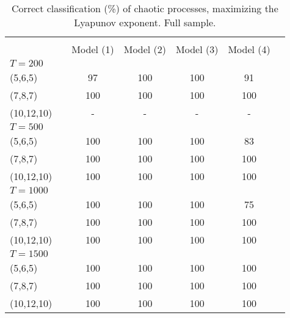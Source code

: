 \documentclass[12pt]{article}
\begin{document}
\begin{table} [H]\scriptsize
    \caption{ Correct classification (\%) of chaotic processes, maximizing the Lyapunov exponent. Full sample.}
    \begin{tabular*}{\textwidth}{@{\extracolsep{\fill}}lcccccc}
        \hline &  &  &  & &   \\ 
          &  &  Model (1) & Model (2)  & Model (3) & Model (4)  \\ 
        $T=200$  &  &  &  & &  & \\
        (5,6,5)                           &  & 97   & 100  & 100 &  91  \\ 
        (7,8,7)                           &  & 100  & 100  & 100 &  100  \\ 
        (10,12,10)                        &  & -    &  -   &  -  &  - \\ 
        \hline 
         $T=500$  &  &   & & &    \\ 

        (5,6,5)                           &  & 100 & 100 & 100 & 83  \\ 
        (7,8,7)                           &  & 100 & 100 & 100 & 100 \\ 
        (10,12,10)                        &  & 100 & 100 & 100 & 100 \\ 
\hline 
         $T=1000$  &  &   &   &  &    \\ 

        (5,6,5)                           &  & 100 & 100 & 100   & 75  \\ 
        (7,8,7)                           &  & 100 & 100 & 100   & 100 \\ 
        (10,12,10)                        &  & 100 & 100 & 100   & 100 \\ 
\hline      
         $T=1500$  &  &   &   &  &   \\ 

        (5,6,5)                           &  & 100 & 100 &  100  &  100  \\ 
        (7,8,7)                           &  & 100 & 100 &  100  &  100 \\ 
        (10,12,10)                        &  & 100 & 100 &  100  &  100 \\ 
\hline      
    \end{tabular*}
\end{table}
\end{document}
